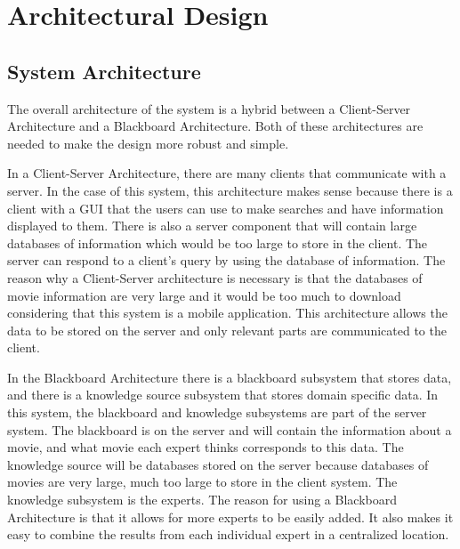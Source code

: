 \documentclass[]{article}
\begin{document}
\section{Architectural Design}
\label{sec:architectural_design}

\subsection{System Architecture}
\label{sub:system_architecture}
The overall architecture of the system is a hybrid between a Client-Server Architecture and a Blackboard Architecture. Both of these architectures are needed to make the design more robust and simple.

In a Client-Server Architecture, there are many clients that communicate with a server. In the case of this system, this architecture makes sense because there is a client with a GUI that the users can use to make searches and have information displayed to them. There is also a server component that will contain large databases of information which would be too large to store in the client. The server can respond to a client's query by using the database of information. The reason why a Client-Server architecture is necessary is that the databases of movie information are very large and it would be too much to download considering that this system is a mobile application. This architecture allows the data to be stored on the server and only relevant parts are communicated to the client.

In the Blackboard Architecture there is a blackboard subsystem that stores data, and there is a knowledge source subsystem that stores domain specific data. In this system, the blackboard and knowledge subsystems are part of the server system. The blackboard is on the server and will contain the information about a movie, and what movie each expert thinks corresponds to this data. The knowledge source will be databases stored on the server because databases of movies are very large, much too large to store in the client system. The knowledge subsystem is the experts. The reason for using a Blackboard Architecture is that it allows for more experts to be easily added. It also makes it easy to combine the results from each individual expert in a centralized location.
\end{document}
